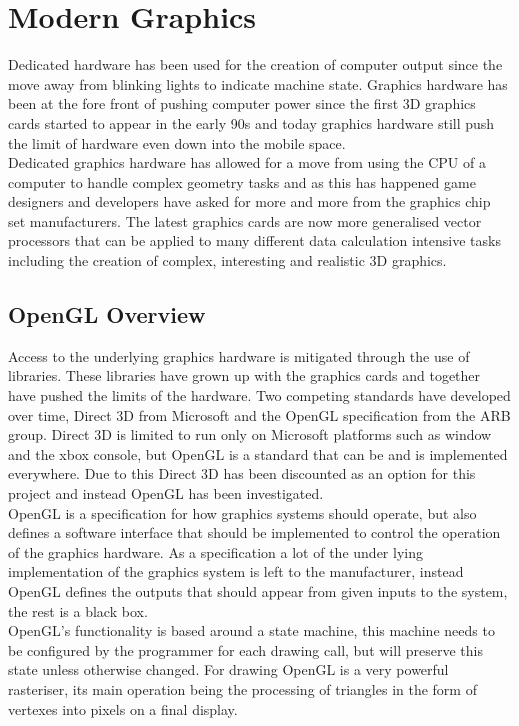 \section{Modern Graphics}
Dedicated hardware has been used for the creation of computer output since the
move away from blinking lights to indicate machine state. Graphics hardware has
been at the fore front of pushing computer power since the first 3D graphics 
cards started to appear in the early 90s and today graphics hardware still push
the limit of hardware even down into the mobile space.\\

Dedicated graphics hardware has allowed for a move from using the CPU of a 
computer to handle complex geometry tasks and as this has happened game designers
and developers have asked for more and more from the graphics chip set
manufacturers. The latest graphics cards are now more generalised vector 
processors that can be applied to many different data calculation intensive tasks
including the creation of complex, interesting and realistic 3D graphics.\\

\subsection{OpenGL Overview} 
Access to the underlying graphics hardware is mitigated through the use of libraries.
These libraries have grown up with the graphics cards and together have pushed the 
limits of the hardware. Two competing standards have developed over time, Direct
3D \cite{DirectX}from Microsoft and the OpenGL\cite{OpenGL} specification 
from the ARB group. Direct 3D is 
limited to run only on Microsoft platforms such as window and the xbox console,
but OpenGL is a standard that can be and is implemented everywhere. Due to this
Direct 3D has been discounted as an option for this project and instead OpenGL
has been investigated.\\

OpenGL is a specification for how graphics systems should operate, but also 
defines a software interface that should be implemented to control the operation
of the graphics hardware. As a specification a lot of the under lying 
implementation of the graphics system is left to the manufacturer, instead 
OpenGL defines the outputs that should appear from given inputs to the system,
the rest is a black box.\\

OpenGL's functionality is based around a state machine, this machine needs to be
configured by the programmer for each drawing call, but will preserve this state 
unless otherwise changed. For drawing OpenGL is a very powerful rasteriser, its
main operation being the processing of triangles in the form of vertexes into
pixels on a final display. \\

